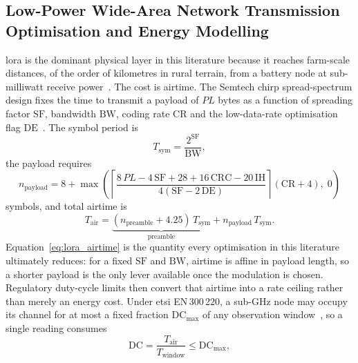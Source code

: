 \documentclass[12pt,a4paper,oneside]{book}
\begin{document}
\subsection{Low-Power Wide-Area Network Transmission Optimisation and Energy
Modelling}
\label{subsec:lit_lpwan}

\gls{lora} is the dominant physical layer in this literature because it
reaches farm-scale distances, of the order of kilometres in rural terrain,
from a battery node at sub-milliwatt receive
power~\cite{raza2018lorawan, li2020performance, raj2017comprehensive}. The
cost is airtime. The Semtech chirp spread-spectrum design fixes the time to
transmit a payload of $PL$ bytes as a function of spreading factor $\mathrm{SF}$,
bandwidth $\mathrm{BW}$, coding rate $\mathrm{CR}$ and the low-data-rate
optimisation flag $\mathrm{DE}$~\cite{semtech2015lorawan, bor2016lorawan}.
The symbol period is
\begin{equation}
T_{\text{sym}} = \frac{2^{\mathrm{SF}}}{\mathrm{BW}},
\label{eq:lora_symbol}
\end{equation}
the payload requires
\begin{equation}
n_{\text{payload}} = 8 + \max\!\left(
  \left\lceil \frac{8\,PL - 4\,\mathrm{SF} + 28 + 16\,\mathrm{CRC} - 20\,\mathrm{IH}}
                    {4(\mathrm{SF} - 2\,\mathrm{DE})} \right\rceil
  (\mathrm{CR}+4),\; 0 \right)
\label{eq:lora_payload_symbols}
\end{equation}
symbols, and total airtime is
\begin{equation}
T_{\text{air}} = \underbrace{(n_{\text{preamble}} + 4.25)\, T_{\text{sym}}}_{\text{preamble}}
               + n_{\text{payload}} \, T_{\text{sym}}.
\label{eq:lora_airtime}
\end{equation}
Equation~\ref{eq:lora_airtime} is the quantity every optimisation in this
literature ultimately reduces: for a fixed $\mathrm{SF}$ and $\mathrm{BW}$,
airtime is affine in payload length, so a shorter payload is the only lever
available once the modulation is chosen. Regulatory duty-cycle limits then
convert that airtime into a rate ceiling rather than merely an energy cost.
Under \gls{etsi} EN\,300\,220, a sub-GHz node may occupy its channel for at
most a fixed fraction $\mathrm{DC}_{\max}$ of any observation
window~\cite{ttn2024eu868, loraalliance2021regional}, so a single reading
consumes
\begin{equation}
\mathrm{DC} = \frac{T_{\text{air}}}{T_{\text{window}}} \leq \mathrm{DC}_{\max},
\label{eq:duty_cycle}
\end{equation}
\end{document}
